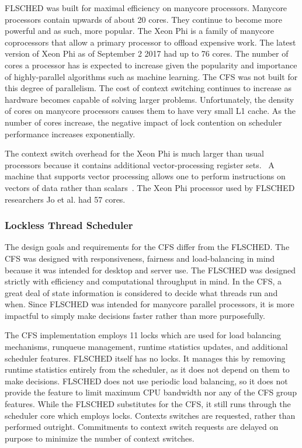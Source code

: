 \documentclass{sig-alternate}
\begin{document}
FLSCHED was built for maximal efficiency on manycore processors. Manycore processors contain upwards of about 20 cores. They continue to become more powerful and as such, more popular. The Xeon Phi is a family of manycore coprocessors that allow a primary processor to offload expensive work. The latest version of Xeon Phi as of September 2 2017 had up to 76 cores. The number of cores a processor has is expected to increase given the popularity and importance of highly-parallel algorithms such as machine learning. The CFS was not built for this degree of parallelism. The cost of context switching continues to increase as hardware becomes capable of solving larger problems. Unfortunately, the density of cores on manycore processors causes them to have very small L1 cache. As the number of cores increase, the negative impact of lock contention on scheduler performance increases exponentially.

The context switch overhead for the Xeon Phi is much larger than usual processors because it contains additional vector-processing register sets.~\cite{Jo:2017} A machine that supports vector processing allows one to perform instructions on vectors of data rather than scalars~\cite{Mellon}. The Xeon Phi processor used by FLSCHED researchers Jo et al. had 57 cores.~\cite{Jo:2017}

\subsubsection{Lockless Thread Scheduler}
\label{sec:flsched_about}

The design goals and requirements for the CFS differ from the FLSCHED. The CFS was designed with responsiveness, fairness and load-balancing in mind because it was intended for desktop and server use. The FLSCHED was designed strictly with efficiency and computational throughput in mind. In the CFS, a great deal of state information is considered to decide what threads run and when. Since FLSCHED was intended for manycore parallel processors, it is more impactful to simply make decisions faster rather than more purposefully.~\cite{Jo:2017}

The CFS implementation employs 11 locks which are used for load balancing mechanisms, runqueue management, runtime statistics updates, and additional scheduler features. FLSCHED itself has no locks. It manages this by removing runtime statistics entirely from the scheduler, as it does not depend on them to make decisions. FLSCHED does not use periodic load balancing, so it does not provide the feature to limit maximum CPU bandwidth nor any of the CFS group features. While the FLSCHED substitutes for the CFS, it still runs through the scheduler core which employs locks. Contexts switches are requested, rather than performed outright. Commitments to context switch requests are delayed on purpose to minimize the number of context switches.~\cite{Jo:2017}
\end{document}

